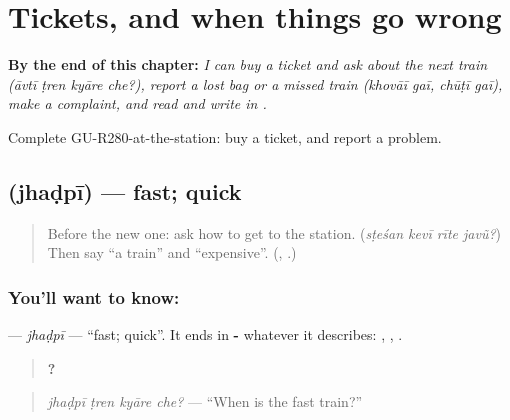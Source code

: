 
\chapter{Tickets, and when things go wrong}
\label{ch:gu-tickets-and-when-things-go-wrong}

\begin{chapteropening}
\textbf{By the end of this chapter:} \emph{I can buy a ticket and ask about the next train (āvtī ṭren kyāre che?), report a lost bag or a missed train (khovāī gaī, chūṭī gaī), make a complaint, and read and write  in .}

Complete GU-R280-at-the-station: buy a ticket, and report a problem.
\end{chapteropening}

\section[\texorpdfstring{\gu{ઝડપી} (jhaḍpī)}{ઝડપી (jhaḍpī)}]{ (jhaḍpī) — fast; quick}

\label{lesson:GU-C280-jhadpi}



\begin{quote}
Before the new one: ask how to get to the station. (\emph{sṭeśan kevī rīte javũ?}) Then say \textquotedblleft{}a train\textquotedblright{} and \textquotedblleft{}expensive\textquotedblright{}. (\textbf{}, \textbf{}.)
\end{quote}

\subsection*{You'll want to know: }
\textbf{} — \emph{jhaḍpī} — \textquotedblleft{}fast; quick\textquotedblright{}. It ends in \textbf{-} whatever it describes: \textbf{ }, \textbf{ }, \textbf{ }.

\begin{quote}
\textbf{   ?}
\end{quote}

\begin{quote}
\emph{jhaḍpī ṭren kyāre che?} — \textquotedblleft{}When is the fast train?\textquotedblright{}
\end{quote}

